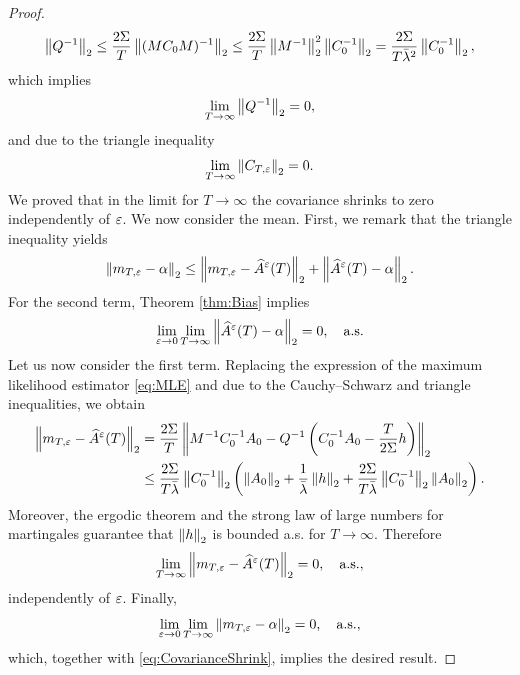\documentclass[10pt]{article}
\begin{document}
\begin{proof}
\begin{equation}
		\left\|Q^{-1}\right\|_2 \leq \frac{2\Sigma}T \left\|(MC_0M)^{-1}\right\|_2 \leq \frac{2\Sigma}T \left\|M^{-1}\right\|_2^2 \left\|C_0^{-1}\right\|_2 = \frac{2\Sigma}{T\bar \lambda^2} \left\|C_0^{-1}\right\|_2,
	\end{equation}
	which implies
	\begin{equation}
		\lim_{T \to \infty}\left\|Q^{-1}\right\|_2 = 0,
	\end{equation}
	and due to the triangle inequality
	\begin{equation}\label{eq:CovarianceShrink}
		\lim_{T \to \infty}\left\|C_{T,\varepsilon}\right\|_2 = 0.
	\end{equation}
	We proved that in the limit for $T \to \infty$ the covariance shrinks to zero independently of $\varepsilon$. We now consider the mean. First, we remark that the triangle inequality yields
	\begin{equation}
		\left\|m_{T,\varepsilon} - \alpha\right\|_2 \leq \left\|m_{T,\varepsilon} - \widehat A^\varepsilon(T)\right\|_2 + \left\|\widehat A^\varepsilon(T) - \alpha\right\|_2.
	\end{equation}
	For the second term, Theorem \ref{thm:Bias} implies 
	\begin{equation}
		\lim_{\varepsilon \to 0} \lim_{T \to \infty}\left\|\widehat A^\varepsilon(T) - \alpha\right\|_2 = 0, \quad \text{a.s.}
	\end{equation}
	Let us now consider the first term.	Replacing the expression of the maximum likelihood estimator \eqref{eq:MLE} and due to the Cauchy--Schwarz and triangle inequalities, we obtain
	\begin{equation}
	\begin{aligned}
		\left\|m_{T,\varepsilon} - \widehat A^\varepsilon(T)\right\|_2 &= \frac{2\Sigma}T\left\|M^{-1}C_0^{-1}A_0 - Q^{-1}\left(C_0^{-1}A_0 - \frac{T}{2\Sigma} h \right)\right\|_2\\
		&\leq \frac{2\Sigma}{T\bar \lambda} \left\|C_0^{-1}\right\|_2 \left(\left\|A_0\right\|_2 + \frac1{\bar \lambda}\left\|h\right\|_2 + \frac{2\Sigma}{T\bar \lambda} \left\|C_0^{-1}\right\|_2\left\|A_0\right\|_2\right).
	\end{aligned}
	\end{equation}
	Moreover, the ergodic theorem and the strong law of large numbers for martingales guarantee that $\left\|h\right\|_2$ is bounded a.s. for $T \to \infty$. Therefore
	\begin{equation}
	\lim_{T\to\infty} \left\|m_{T,\varepsilon} - \widehat A^\varepsilon(T)\right\|_2 = 0, \quad \text{a.s.},
	\end{equation}
	independently of $\varepsilon$. Finally, 
	\begin{equation}
		\lim_{\varepsilon \to 0} \lim_{T \to \infty}\left\|m_{T,\varepsilon} - \alpha\right\|_2 = 0, \quad \text{a.s.},
	\end{equation}
	which, together with \eqref{eq:CovarianceShrink}, implies the desired result. 
\end{proof}
\end{document}
